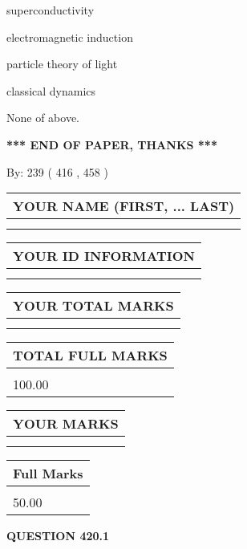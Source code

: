 \documentclass[12pt]{article}
\begin{document}
 
superconductivity
 
 
electromagnetic induction
 
 
particle theory of light
 
 
classical dynamics
 
 
 None of above.
 
 
   
   
\vspace{1.0in} 
{\textbf{\large{ *** END OF PAPER, THANKS *** }}} 
   
   
\hspace{1.0in} By: 
 239 ( 416 ,  458 )
   
   
   
   
\newpage 
\setcounter{page}{ 
   420001 } 
   
   
   
   
\noindent\begin{tabular}{|l|}
\hline
YOUR NAME (FIRST, ... LAST)  \\
\hline
 \\ 
 \\ 
\hline
\end{tabular}
\hspace{0.05in} \begin{tabular}{|l|}
\hline
 YOUR   ID   INFORMATION  \\
\hline
 \\ 
 \\ 
\hline
\end{tabular}
   
   
\vspace{0.2in}\noindent\begin{tabular}{|l|}
\hline
YOUR TOTAL MARKS  \\
\hline
 \\ 
 \\ 
\hline
\end{tabular}
\hspace{0.05in} \begin{tabular}{|l|}
\hline
TOTAL FULL MARKS  \\
\hline
 \\ 
100.00 \\
\hline
\end{tabular}
  
\vspace{0.2in}
  
\noindent\begin{tabular}{|l|}
\hline
 YOUR MARKS  \\
\hline
 \\ 
 \\ 
\hline
\end{tabular}
\hspace{0.05in} \begin{tabular}{|l|}
\hline
 Full Marks  \\
\hline
 \\ 
50.00 \\
\hline
\end{tabular}
{\textbf{\Large{QUESTION
420.1 
}}}
  
\end{document}
